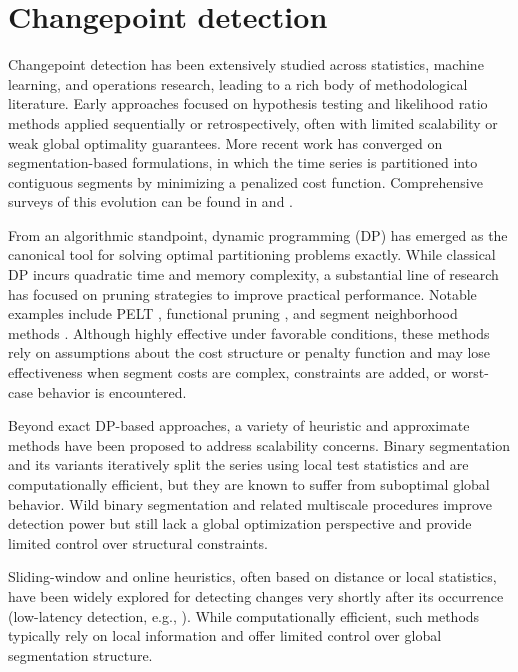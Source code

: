 \documentclass[runningheads]{llncs}
\begin{document}
\section{Changepoint detection} 	\label{sec:changepoints}

Changepoint detection has been extensively studied across statistics, machine learning, and operations research, leading to a rich body of methodological literature. Early approaches focused on hypothesis testing and likelihood ratio methods applied sequentially or retrospectively, often with limited scalability or weak global optimality guarantees. More recent work has converged on segmentation-based formulations, in which the time series is partitioned into contiguous segments by minimizing a penalized cost function. Comprehensive surveys of this evolution can be found in \cite{AC17} and \cite{TOV20}.

From an algorithmic standpoint, dynamic programming (DP) has emerged as the canonical tool for solving optimal partitioning problems exactly. While classical DP incurs quadratic time and memory complexity, a substantial line of research has focused on pruning strategies to improve practical performance. Notable examples include PELT \cite{KFE12}, functional pruning \cite{R15}, and segment neighborhood methods \cite{AL89}. Although highly effective under favorable conditions, these methods rely on assumptions about the cost structure or penalty function and may lose effectiveness when segment costs are complex, constraints are added, or worst-case behavior is encountered.

Beyond exact DP-based approaches, a variety of heuristic and approximate methods have been proposed to address scalability concerns. Binary segmentation and its variants \cite{SK74} \cite{FLS09} iteratively split the series using local test statistics and are computationally efficient, but they are known to suffer from suboptimal global behavior. Wild binary segmentation and related multiscale procedures improve detection power but still lack a global optimization perspective and provide limited control over structural constraints.

Sliding-window and online heuristics, often based on distance or local statistics, have been widely explored for detecting changes very shortly after its occurrence (low-latency detection, e.g., \cite{KCHP01} \cite{KCHP02}). While computationally efficient, such methods typically rely on local information and offer limited control over global segmentation structure.
\end{document}
